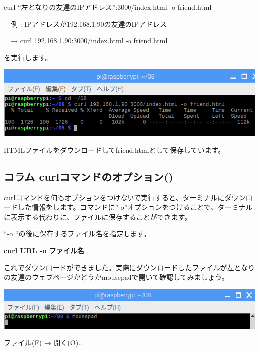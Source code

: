 \documentclass[a4paper,12pt,dvipdfmx]{jarticle}
\begin{document}
curl “左となりの友達のIPアドレス”:3000/index.html -o
friend.html

\ \ 例 :
IPアドレスが192.168.1.90の友達のIPアドレス

\ \ → curl 192.168.1.90:3000/index.html -o friend.html

を実行します。

\begin{center}
\includegraphics[width=17.006cm]{textbook-img005.png}

\end{center}

\bigskip

HTMLファイルをダウンロードしてfriend.htmlとして保存しています。



\begin{center}
\begin{boxedminipage}{17.228cm}
\section*{コラム
curlコマンドのオプション()}

\bigskip

curlコマンドを何もオプションをつけないで実行すると、ターミナルにダウンロードした情報をします。コマンドに”-o”オプションをつけることで、ターミナルに表示する代わりに、ファイルに保存することができます。

“-o
“の後に保存するファイル名を指定します。

	\textbf{curl URL -o ファイル名}
\end{boxedminipage}
\end{center}
\clearpage
これでダウンロードができました。実際にダウンロードしたファイルが左となりの友達のウェブページかどうかmousepadで開いて確認してみましょう。



\begin{center}
\includegraphics[width=17.006cm]{textbook-img006.png}

\end{center}
ファイル(F) → 開く(O)..
\end{document}
